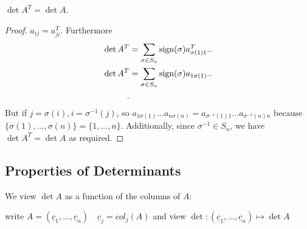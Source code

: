 \begin{prop}
    $\det A^T = \det A$.
\end{prop}
\begin{proof}
  $a_{ij} = a_{ji}^T$. Furthermore
  \begin{align*}
    \det A^T &= \sum_{ \sigma \in S_n} \operatorname{sign}(\sigma) a^T_{\sigma(1) 1} .. \\
    \det A^T &= \sum_{ \sigma \in S_n} \operatorname{sign}(\sigma) a_{1 \sigma(1)} .. \\
  .\end{align*}
  But if $j = \sigma(i), i = \sigma^{-1} (j)$, so $a_{1 \sigma(1)} ... a_{n \sigma(n)} = a_{\sigma^{-1}(1) 1}...a_{\sigma^{-1}(n) n}$ because $\{\sigma(1),...,\sigma(n)\} = \{1,...,n\}$. Additionally, since $\sigma^{-1} \in S_n$, we have $\det A^T = \det A$ as required.
\end{proof}

\subsection{Properties of Determinants}

We view $\det A$ as a function of the columns of $A$:

write $A = (\underline{c}_1, ..., \underline{c}_n) \quad \underline{c}_j = col_j(A)$ and view $\det : (\underline{c}_1 ,..., \underline{c}_n) \mapsto \det A$

